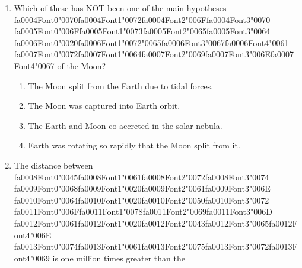 \documentclass[12pt]{article}
\begin{document}
\begin{enumerate}[label=\arabic*.]
\begin{enumerate}[label=(\alph*)]
    \item Radar from the earth can only see Mercury's poles.
    \item These craters contain the only permanently shadowed regions on Mercury
\end{enumerate}
\item Which of these has NOT been one of the main hypotheses {\csname fa0004Font0\endcsname\char"0070}{\csname fa0004Font1\endcsname\char"0072}{\csname fa0004Font2\endcsname\char"006F}{\csname fa0004Font3\endcsname\char"0070} {\csname fa0005Font0\endcsname\char"006F}{\csname fa0005Font1\endcsname\char"0073}{\csname fa0005Font2\endcsname\char"0065}{\csname fa0005Font3\endcsname\char"0064} {\csname fa0006Font0\endcsname\char"0020}{\csname fa0006Font1\endcsname\char"0072}{\char"0065}{\csname fa0006Font3\endcsname\char"0067}{\csname fa0006Font4\endcsname\char"0061} {\csname fa0007Font0\endcsname\char"0072}{\csname fa0007Font1\endcsname\char"0064}{\csname fa0007Font2\endcsname\char"0069}{\csname fa0007Font3\endcsname\char"006E}{\csname fa0007Font4\endcsname\char"0067} of the
Moon?
\begin{enumerate}[label=(\alph*)]
    \item The Moon split from the Earth due to tidal forces.
    \item The Moon was captured into Earth orbit.
    \item The Earth and Moon co-accreted in the solar nebula.
    \item Earth was rotating so rapidly that the Moon split from it.
\end{enumerate}
\item The distance between {\csname fa0008Font0\endcsname\char"0045}{\csname fa0008Font1\endcsname\char"0061}{\csname fa0008Font2\endcsname\char"0072}{\csname fa0008Font3\endcsname\char"0074} {\csname fa0009Font0\endcsname\char"0068}{\csname fa0009Font1\endcsname\char"0020}{\csname fa0009Font2\endcsname\char"0061}{\csname fa0009Font3\endcsname\char"006E} {\csname fa0010Font0\endcsname\char"0064}{\csname fa0010Font1\endcsname\char"0020}{\csname fa0010Font2\endcsname\char"0050}{\csname fa0010Font3\endcsname\char"0072} {\csname fa0011Font0\endcsname\char"006F}{\csname fa0011Font1\endcsname\char"0078}{\csname fa0011Font2\endcsname\char"0069}{\csname fa0011Font3\endcsname\char"006D} {\csname fa0012Font0\endcsname\char"0061}{\csname fa0012Font1\endcsname\char"0020}{\csname fa0012Font2\endcsname\char"0043}{\csname fa0012Font3\endcsname\char"0065}{\csname fa0012Font4\endcsname\char"006E} {\csname fa0013Font0\endcsname\char"0074}{\csname fa0013Font1\endcsname\char"0061}{\csname fa0013Font2\endcsname\char"0075}{\csname fa0013Font3\endcsname\char"0072}{\csname fa0013Font4\endcsname\char"0069} is one million times greater than the

\end{enumerate}
\end{document}
